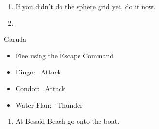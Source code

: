 \begin{enumerate}[resume]
	\item If you didn't do the sphere grid yet, do it now.
	\item \formation{\tidus}{\yuna}{\lulu}
\end{enumerate}
\begin{battle}{Garuda}
	\begin{itemize}
		\item Flee using the Escape Command
	\end{itemize}
\end{battle}
\begin{encounters}
	\begin{itemize}
		\item Dingo: \tidus\ Attack
		\item Condor: \wakka\ Attack
		\item Water Flan: \lulu\ Thunder
	\end{itemize}
\end{encounters}
\begin{enumerate}[resume]
	\item At Besaid Beach go onto the boat.
\end{enumerate}